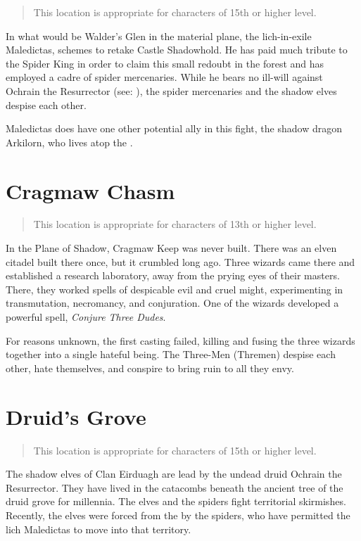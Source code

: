 \begin{quote}
  This location is appropriate for characters of 15th or higher level.
\end{quote}

In what would be Walder's Glen in the material plane, the lich-in-exile Maledictas,
schemes to retake Castle Shadowhold. He has paid much tribute to the Spider King
in order to claim this small redoubt in the forest and has employed a cadre of spider
mercenaries. While he bears no ill-will against Ochrain the Resurrector
(see: ), the spider
mercenaries and the shadow elves despise each other.

Maledictas does have one other potential ally in this fight, the shadow dragon
Arkilorn, who lives atop the .


\section{Cragmaw Chasm} \label{loc:cragmawchasm}

\begin{quote}
  This location is appropriate for characters of 13th or higher level.
\end{quote}

In the Plane of Shadow, Cragmaw Keep was never built. There was an elven citadel
built there once, but it crumbled long ago. Three wizards came there and established
a research laboratory, away from the prying eyes of their masters. There, they worked
spells of despicable evil and cruel might, experimenting in transmutation, necromancy,
and conjuration. One of the wizards developed a powerful spell, \textit{Conjure Three Dudes}.

For reasons unknown, the first casting failed, killing and fusing the three wizards
together into a single hateful being. The Three-Men (Thremen) despise each other,
hate themselves, and conspire to bring ruin to all they envy.

\section{Druid's Grove} \label{loc:druidsgrove}

\begin{quote}
  This location is appropriate for characters of 15th or higher level.
\end{quote}

The shadow elves of Clan Eirduagh are lead by the undead druid Ochrain the Resurrector.
They have lived in the catacombs beneath the ancient tree of the druid grove for
millennia. The elves and the spiders fight territorial skirmishes. Recently, the elves
were forced from the  by the spiders, who have permitted the lich Maledictas
to move into that territory.

